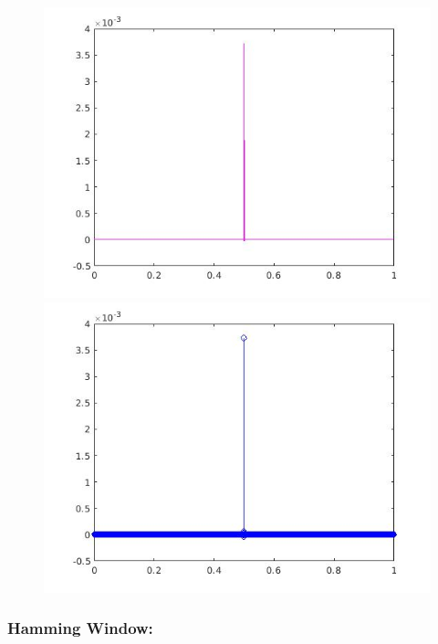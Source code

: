 \documentclass[a4paper,11pt]{article}
\begin{document}
\begin{figure}[!hp]
\centering
\begin{minipage}{.5\textwidth}
  \centering
  \includegraphics[width=1\linewidth]{images/lab2_66.jpg}
\end{minipage}%
\begin{minipage}{.5\textwidth}
  \centering
  \includegraphics[width=1\linewidth]{images/lab2_67.jpg}
\end{minipage}
\end{figure}

\subsubsection{Hamming Window:}
\end{document}
